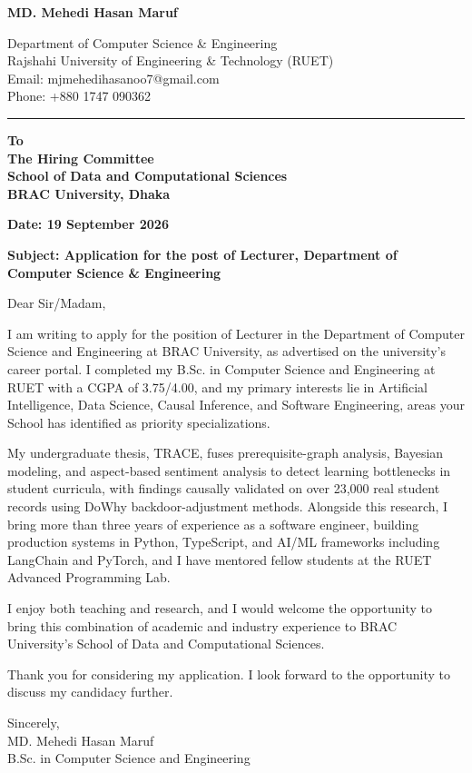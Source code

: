 \documentclass[11pt, a4paper]{article}
\begin{document}
{\Huge\bfseries MD. Mehedi Hasan Maruf}

\vspace{0.8em}
Department of Computer Science \& Engineering \\
Rajshahi University of Engineering \& Technology (RUET) \\
Email: mjmehedihasanoo7@gmail.com \\
Phone: +880 1747 090362

\vspace{0.6em}
\noindent\rule{\linewidth}{1.2pt}
\vspace{0.8em}

\begin{minipage}[t]{0.68\textwidth}
\textbf{To}\\
\textbf{The Hiring Committee}\\
\textbf{School of Data and Computational Sciences}\\
\textbf{BRAC University, Dhaka}
\end{minipage}\hfill
\begin{minipage}[t]{0.28\textwidth}
\raggedleft\textbf{Date: 19 September 2026}
\end{minipage}

\vspace{0.6em}
\textbf{Subject: Application for the post of Lecturer, Department of Computer Science \& Engineering}

Dear Sir/Madam,

I am writing to apply for the position of Lecturer in the Department of Computer Science and Engineering at BRAC University, as advertised on the university's career portal. I completed my B.Sc. in Computer Science and Engineering at RUET with a CGPA of 3.75/4.00, and my primary interests lie in Artificial Intelligence, Data Science, Causal Inference, and Software Engineering, areas your School has identified as priority specializations.

My undergraduate thesis, TRACE, fuses prerequisite-graph analysis, Bayesian modeling, and aspect-based sentiment analysis to detect learning bottlenecks in student curricula, with findings causally validated on over 23,000 real student records using DoWhy backdoor-adjustment methods. Alongside this research, I bring more than three years of experience as a software engineer, building production systems in Python, TypeScript, and AI/ML frameworks including LangChain and PyTorch, and I have mentored fellow students at the RUET Advanced Programming Lab.

I enjoy both teaching and research, and I would welcome the opportunity to bring this combination of academic and industry experience to BRAC University's School of Data and Computational Sciences.

Thank you for considering my application. I look forward to the opportunity to discuss my candidacy further.

Sincerely,\\
MD. Mehedi Hasan Maruf\\
B.Sc. in Computer Science and Engineering
\end{document}
